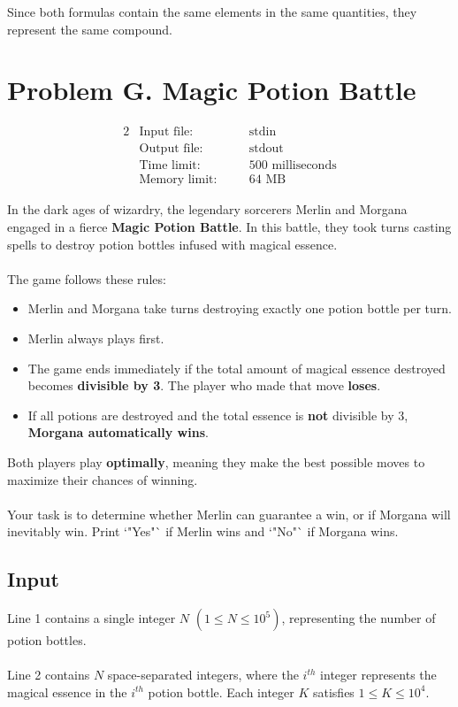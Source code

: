 \documentclass[12pt,a4paper]{article}
\begin{document}
Since both formulas contain the same elements in the same quantities, they represent the same compound.

\newpage

\section*{\fontsize{18}{12}Problem G. Magic Potion Battle}

\begin{alignat*} {2}
 &   \text{Input file:}   \quad     &&\text{stdin}\\
 &   \text{Output file:}  \quad     &&\text{stdout}\\
 &   \text{Time limit:}   \quad     &&\text{500 milliseconds}\\
 &   \text{Memory limit:} \quad     &&\text{64 MB}
\end{alignat*}

\noindent
In the dark ages of wizardry, the legendary sorcerers Merlin and Morgana engaged in a fierce \textbf{Magic Potion Battle}. In this battle, they took turns casting spells to destroy potion bottles infused with magical essence. 
\\\\
\noindent
The game follows these rules:
\begin{itemize}
    \item Merlin and Morgana take turns destroying exactly one potion bottle per turn.
    \item Merlin always plays first.
    \item The game ends immediately if the total amount of magical essence destroyed becomes \textbf{divisible by 3}. The player who made that move \textbf{loses}.
    \item If all potions are destroyed and the total essence is \textbf{not} divisible by 3, \textbf{Morgana automatically wins}.
\end{itemize}

\noindent
Both players play \textbf{optimally}, meaning they make the best possible moves to maximize their chances of winning. 
\\\\
\noindent
Your task is to determine whether Merlin can guarantee a win, or if Morgana will inevitably win. Print `"Yes"` if Merlin wins and `"No"` if Morgana wins.

\subsection*{\fontsize{16}{12}Input}
Line 1 contains a single integer \( N \) \((1 \leq N \leq 10^5)\), representing the number of potion bottles.
\\\\
\noindent
Line 2 contains \( N \) space-separated integers, where the \( i^{th} \) integer represents the magical essence in the \( i^{th} \) potion bottle. Each integer \( K \) satisfies \( 1 \leq K \leq 10^4 \).
\end{document}
